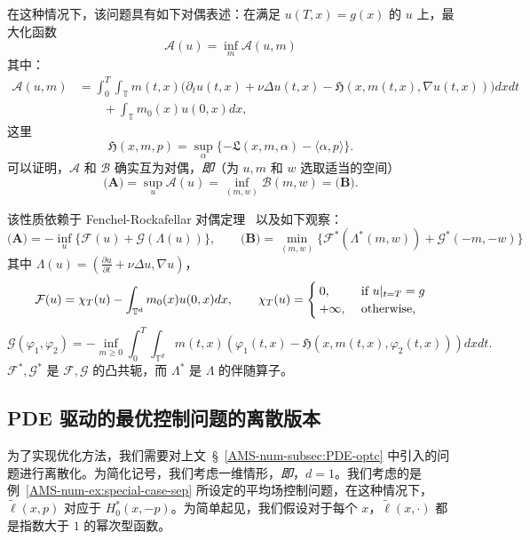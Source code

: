 \documentclass{amsproc}
\theoremstyle{definition}
\theoremstyle{remark}
\numberwithin{equation}{section}
\newcommand{\TT}{{\mathbb T}}
\newcommand{\cA}{{\mathcal A}}
\newcommand{\cB}{{\mathcal B}}
\newcommand{\cF}{{\mathcal F}}
\newcommand{\cG}{{\mathcal G}}
\newcommand{\ctrl}{\alpha}
\newcommand{\grad}{\nabla}
\begin{document}
在这种情况下，该问题具有如下对偶表述：在满足 $u(T,x) = g(x)$ 的 $u$ 上，最大化函数
 \begin{equation}
 \label{AMS-num-eq:variational-dual-A}
 	\cA(u) = \inf_{m} \cA(u, m)
 \end{equation}
其中：
\begin{align*}
	\cA(u,m)
	&=
	\int_0^T \int_{\TT}
	m(t,x) \Big(\partial_t u (t,x) + \nu \Delta u(t,x) - \mathfrak{H}(x, m(t,x), \nabla u(t,x))  \Big)
	dx dt
	\\
	&\qquad+
	\int_{\TT} m_0(x) u(0,x) dx,
\end{align*}
这里
$$
	\mathfrak{H}(x,m,p) = \sup_{\ctrl} \{ - \mathfrak{L}(x,m,\ctrl) - \langle \ctrl, p \rangle \}.
$$
可以证明，$\cA$ 和 $\cB$ 确实互为对偶，\textit{即}（为 $u, m$ 和 $w$ 选取适当的空间）
$$
	\textbf{(A)} = \sup_{u} \cA(u) = \inf_{(m,w)} \cB(m,w) = \textbf{(B)}.
$$

该性质依赖于 Fenchel-Rockafellar 对偶定理~\cite{MR1451876} 以及如下观察：
$$
	\textbf{(A)}
	=
	- \inf_{u} \Big\{ \cF(u) + \cG(\Lambda(u)) \Big\},
	\qquad
	\textbf{(B)} = \min_{(m,w)} \Big\{ \cF^*(\Lambda^*(m,w)) + \cG^*(-m,-w)\Big\}
$$
其中 $ \Lambda(u)= \left(\frac{\partial u} {\partial t}   +   \nu \Delta u, \grad u \right)$，
  \begin{equation*}
    \cF(u)= \chi_T(u)- \int_{\TT^d} m_0(x)u(0,x)dx, 
    \qquad
    \chi_T(u)=
    \begin{cases}
    0, & \hbox{ if } u|_{t=T} = g \\
    +\infty, & \hbox{ otherwise,}
    \end{cases}
  \end{equation*}
\begin{equation*}
\cG(\varphi_1, \varphi_2)= -\inf_{ m\ge 0    } \int_0^T \int_{\TT^d}    m(t,x) \left( \varphi_1(t,x) -  \mathfrak{H} (x, m(t,x), \varphi_2(t,x) )  \right)    dx dt   .
\end{equation*}
$\cF^*, \cG^*$ 是 $\cF,\cG$ 的凸共轭，而 $\Lambda^*$ 是 $\Lambda$ 的伴随算子。








\subsection{PDE 驱动的最优控制问题的离散版本}
\label{AMS-num-subsec:PDE-optc-discrete}

为了实现优化方法，我们需要对上文~\S~\ref{AMS-num-subsec:PDE-optc} 中引入的问题进行离散化。为简化记号，我们考虑一维情形，\textit{即}，$d=1$。我们考虑的是例~\ref{AMS-num-ex:special-case-sep} 所设定的平均场控制问题，在这种情况下，$\tilde \ell(x,p)$ 对应于 $H_0^*(x, -p)$。为简单起见，我们假设对于每个 $x$，$\tilde \ell(x,\cdot)$ 都是指数大于 $1$ 的幂次型函数。
\end{document}
